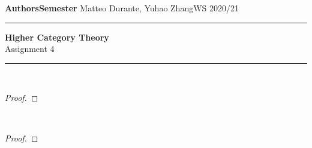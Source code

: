 \documentclass[a4paper,11pt,openany]{scrartcl}
\begin{document}
\noindent\textbf{Authors}\hfill\textbf{Semester} \linebreak
\vspace*{-.1cm} Matteo Durante, Yuhao Zhang\hfill WS 2020/21 \\

\noindent
\rule{\linewidth}{1pt}
\begin{center}
\Large
\textbf{Higher Category Theory} \\
Assignment 4
\end{center}
\rule{\linewidth}{1pt}
\\


\begin{proof}
\end{proof}

~\\
\begin{proof}
\end{proof}
\end{document}
